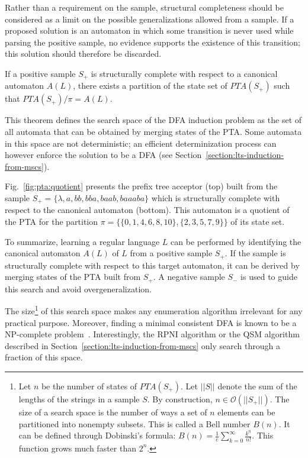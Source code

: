 Rather than a requirement on the sample, structural completeness should be considered as a limit on the possible generalizations allowed from a sample. If a proposed solution is an automaton in which some transition is never used while parsing the positive sample, no evidence supports the existence of this transition; this solution should therefore be discarded. 

\begin{theorem}
\label{search:theo}
If a positive sample $S_+$ is structurally complete with respect to a canonical automaton $A(L)$, there exists a partition of the state set of $PTA(S_+)$ such that $PTA(S_+)/\pi = A(L)$.
\end{theorem} 

This theorem defines the search space of the DFA induction problem as the set of all automata that can be obtained by merging states of the PTA. Some automata in this space are not deterministic; an efficient determinization process can however enforce the solution to be a DFA (see Section~\ref{section:lts-induction-from-mscs}).

Fig.~\ref{fig:pta:quotient} presents the prefix tree acceptor (top) built from the sample 
$S_+ = \{\lambda,a,bb,bba,baab,baaaba\}$ which is structurally complete with respect to the canonical automaton (bottom).
This automaton is a quotient of the PTA for the partition $\pi=\{\{0,1,4,6,8,10\},\{2,3,5,7,9\}\}$ of its state set.

To summarize, learning a regular language $L$ can be performed by identifying the canonical automaton $A(L)$ of $L$ from a positive sample $S_+$. If the sample is structurally complete with respect to this target automaton, it can be derived by merging states of the PTA built from $S_+$. A negative sample $S_-$ is used to guide this search and avoid overgeneralization. 

The size\footnote{Let $n$ be the number of states of $PTA(S_+)$. Let $||S||$ denote the sum of the lengths of the strings in a sample $S$. By construction, $n \in \mathcal{O}(||S_+||)$. The size of a search space is the number of ways a set of $n$ elements can be partitioned into nonempty subsets. This is called a Bell number $B(n)$. It can be defined through Dobinski's formula: $B(n) = \frac{1}{e} \sum_{k=0}^{\infty} \frac{k^n}{n!}$. This function grows much faster than $2^n$.} of this search space makes any enumeration algorithm irrelevant for any practical purpose. Moreover, finding a minimal consistent DFA is known to be a NP-complete problem~\cite{Gold:1978,Angluin:1978}. Interestingly, the RPNI algorithm or the \textsc{QSM} algorithm described in Section~\ref{section:lts-induction-from-mscs} only search through a fraction of this space.

